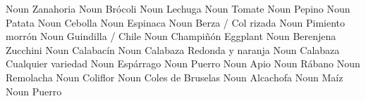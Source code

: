               {}          {Noun}      {Zanahoria}             {}
             {}          {Noun}      {Brócoli}               {}
              {}          {Noun}      {Lechuga}               {}
               {}          {Noun}      {Tomate}                {}
             {}          {Noun}      {Pepino}                {}
               {}          {Noun}      {Patata}                {}
                {}          {Noun}      {Cebolla}               {}
              {}          {Noun}      {Espinaca}              {}
                 {}          {Noun}      {Berza / Col rizada}    {}
          {}          {Noun}      {Pimiento morrón}       {}
         {}          {Noun}      {Guindilla / Chile}     {}
             {}          {Noun}      {Champiñón}             {}
            {Eggplant}  {Noun}      {Berenjena}             {}
            {Zucchini}  {Noun}      {Calabacín}             {}
              {}          {Noun}      {Calabaza}              {Redonda y naranja}
               {}          {Noun}      {Calabaza}              {Cualquier variedad}
            {}          {Noun}      {Espárrago}             {}
                 {}          {Noun}      {Puerro}                {}
               {}          {Noun}      {Apio}                  {}
               {}          {Noun}      {Rábano}                {}
             {}          {Noun}      {Remolacha}             {}
          {}          {Noun}      {Coliflor}              {}
      {}          {Noun}      {Coles de Bruselas}     {}
            {}          {Noun}      {Alcachofa}             {}
                 {}          {Noun}      {Maíz}                  {}
                 {}          {Noun}      {Puerro}                {}
